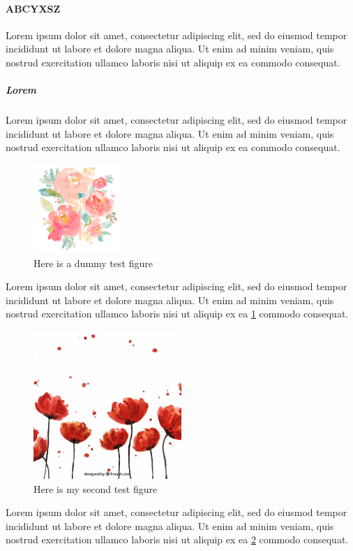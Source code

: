 \documentclass[a4paper,12pt]{article}
\begin{document}
\paragraph*{ABCYXSZ} Lorem ipsum dolor sit amet, consectetur adipiscing elit, sed do eiusmod tempor incididunt ut labore et dolore magna aliqua. Ut enim ad minim veniam, quis nostrud exercitation ullamco laboris nisi ut aliquip ex ea commodo consequat.
\subparagraph{Lorem} Lorem ipsum dolor sit amet, consectetur adipiscing elit, sed do eiusmod tempor incididunt ut labore et dolore magna aliqua. Ut enim ad minim veniam, quis nostrud exercitation ullamco laboris nisi ut aliquip ex ea commodo consequat.\\
\begin{figure}
\centering
\includegraphics[width=0.3\textwidth]{Images/dummy_2}
\caption{Here is a dummy test figure}
\label{floral}
\end{figure}
Lorem ipsum dolor sit amet, consectetur adipiscing elit, sed do eiusmod tempor incididunt ut labore et dolore magna aliqua. Ut enim ad minim veniam, quis nostrud exercitation ullamco laboris nisi ut aliquip ex ea \ref{floral} commodo consequat.\\
\linebreak
\begin{figure}
\centering
\includegraphics[width=0.5\textwidth]{Images/dummy_3}
\caption{Here is my second test figure}
\label{floral2}
\end{figure}
Lorem ipsum dolor sit amet, consectetur adipiscing elit, sed do eiusmod tempor incididunt ut labore et dolore magna aliqua. Ut enim ad minim veniam, quis nostrud exercitation ullamco laboris nisi ut aliquip ex ea \ref{floral2} commodo consequat.
\end{document}

